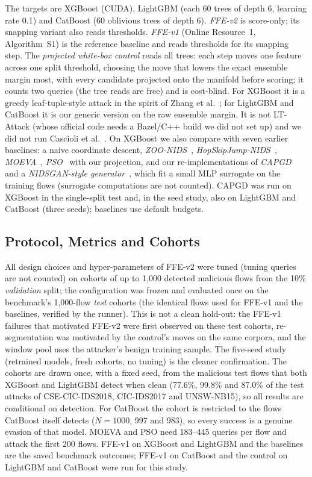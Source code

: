 The targets are XGBoost (CUDA), LightGBM (each 60 trees of depth 6, learning rate 0.1) and CatBoost (60 oblivious trees of depth 6). \emph{FFE-v2} is score-only; its snapping variant also reads thresholds. \emph{FFE-v1} (Online Resource~1, Algorithm~S1) is the reference baseline and reads thresholds for its snapping step. The \emph{projected white-box control} reads all trees: each step moves one feature across one split threshold, choosing the move that lowers the exact ensemble margin most, with every candidate projected onto the manifold before scoring; it counts two queries (the tree reads are free) and is cost-blind. For XGBoost it is a greedy leaf-tuple-style attack in the spirit of Zhang et al.~\cite{zhang2020efficient}; for LightGBM and CatBoost it is our generic version on the raw ensemble margin. It is not LT-Attack (whose official code needs a Bazel/C++ build we did not set up) and we did not run Cascioli et al.~\cite{cascioli2024faster}. On XGBoost we also compare with seven earlier baselines: a naive coordinate descent, \emph{ZOO-NIDS}~\cite{chen2017zoo}, \emph{HopSkipJump-NIDS}~\cite{chen2020hopskipjump}, \emph{MOEVA}~\cite{simonetto2024constrained, ghamizi2020moeva}, \emph{PSO}~\cite{han2021traffic} with our projection, and our re-implementations of \emph{CAPGD}~\cite{simonetto2024constrained} and a \emph{NIDSGAN-style generator}~\cite{zolbayar2022nidsgan}, which fit a small MLP surrogate on the training flows (surrogate computations are not counted). CAPGD was run on XGBoost in the single-split test and, in the seed study, also on LightGBM and CatBoost (three seeds); baselines use default budgets.

\subsection{Protocol, Metrics and Cohorts}
\label{sec:protocol}

All design choices and hyper-parameters of FFE-v2 were tuned (tuning queries are not counted) on cohorts of up to 1,000 detected malicious flows from the 10\% \emph{validation} split; the configuration was frozen and evaluated once on the benchmark's 1,000-flow \emph{test} cohorts (the identical flows used for FFE-v1 and the baselines, verified by the runner). This is not a clean hold-out: the FFE-v1 failures that motivated FFE-v2 were first observed on these test cohorts, re-segmentation was motivated by the control's moves on the same corpora, and the window pool uses the attacker's benign training sample. The five-seed study (retrained models, fresh cohorts, no tuning) is the cleaner confirmation. The cohorts are drawn once, with a fixed seed, from the malicious test flows that both XGBoost and LightGBM detect when clean (77.6\%, 99.8\% and 87.0\% of the test attacks of CSE-CIC-IDS2018, CIC-IDS2017 and UNSW-NB15), so all results are conditional on detection. For CatBoost the cohort is restricted to the flows CatBoost itself detects ($N=1000$, 997 and 983), so every success is a genuine evasion of that model. MOEVA and PSO need 183--445 queries per flow and attack the first 200 flows. FFE-v1 on XGBoost and LightGBM and the baselines are the saved benchmark outcomes; FFE-v1 on CatBoost and the control on LightGBM and CatBoost were run for this study.

